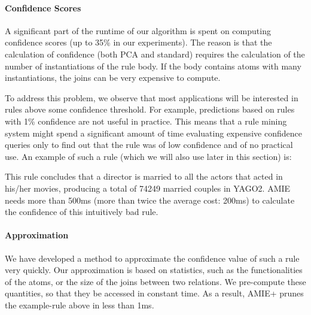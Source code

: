 \paragraph{Confidence Scores} A significant part of the runtime of our algorithm is spent on computing confidence scores (up to 35\% in our experiments).
The reason is that the calculation of confidence (both PCA and standard) requires the calculation of the 
number of instantiations of the rule body. %
If the body contains atoms with many instantiations, the joins can be very expensive to compute.

To address this problem, we observe that most applications will be interested in rules above some confidence threshold. For example, predictions based on rules with 1\% confidence are not useful in practice.
This means that a rule mining system might spend a significant amount of time evaluating expensive confidence queries only to find out that the rule was of low confidence and of no practical use.
An example of such a rule (which we will also use later in this section) is:


\noindent This rule concludes that a director is married to all the actors that acted in his/her movies, producing a total of 74249 married couples in YAGO2.
AMIE needs more than 500ms (more than twice the average cost: 200ms) to calculate the confidence of this intuitively bad rule.


\paragraph{Approximation} We have developed a method to approximate the confidence value of such a rule very quickly. 
Our approximation is based on statistics, such as the functionalities of the atoms, or the size of the joins between two relations. 
We pre-compute these quantities, so that they be accessed in constant time. As a result, AMIE+ prunes the example-rule above in less than 1ms.  

